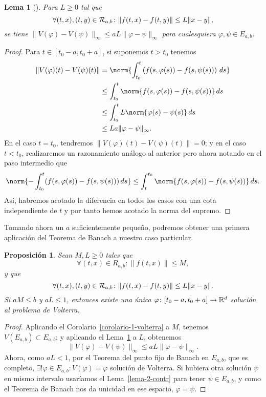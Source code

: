 \documentclass[11pt]{article}
\theoremstyle{plain}
\newtheorem{proposition}{Proposición}
\newtheorem{lemma}{Lema}
\theoremstyle{definition}
\theoremstyle{remark}
\begin{document}
\begin{lemma}[]\label{lema-3-contr}
  Para $L \geq 0$ tal que
  \[
    \forall (t,x),(t,y) \in {{\cal{R}}}_{a,b}\colon
    \| f(t,x) - f(t,y) \| \leq L \|x-y\|, 
  \]
  se tiene $\|V(\varphi) - V(\psi)\|_\infty \leq aL\|\varphi - \psi\|_\infty$ para cualesquiera $\varphi,\psi \in E_{a,b}$.
\end{lemma}
\begin{proof}
  Para $t \in [t_0-a,t_0+a]$, si suponemos $t > t_0$ tenemos
  \[\begin{aligned}
  \| V(\varphi)(t) - V(\psi)(t) \| &=
  \norm{ \int_{t_0}^t \left( f(s,\varphi(s)) - f(s,\psi(s)) \right)\,ds } \\&\leq
  \int_{t_0}^t \norm{  f(s,\varphi(s)) - f(s,\psi(s)) }\,ds \\&\leq
  \int_{t_0}^t L\norm{ \varphi(s)-\psi(s) }\,ds \\&\leq
  La\|\varphi-\psi\|_{\infty}.
  \end{aligned}\]
En el caso $t = t_0$, tendremos $\|V(\varphi)(t) - V(\psi)(t)\| = 0$;
y en el caso $t < t_0$, realizaremos un razonamiento análogo al anterior
pero ahora notando en el paso intermedio que
\[\begin{aligned}
  \norm{-\int_{t_0}^t  (f(s,\varphi(s)) - f(s,\psi(s))) \,ds} \leq
  \int_{t}^{t_0} \norm{f(s,\varphi(s)) - f(s,\psi(s))}\,ds.
\end{aligned}\]
Así, habremos acotado la diferencia en todos los casos con una cota independiente
de $t$ y por tanto hemos acotado la norma del supremo.
\end{proof}

Tomando ahora un $a$ suficientemente pequeño, podremos obtener una primera
aplicación del Teorema de Banach a nuestro caso particular.

\begin{proposition}\label{proposicion-1-contr}
Sean $M,L \geq 0$ tales que
\[\forall (t,x) \in R_{a,b}\colon \|f(t,x)\| \leq M,\]
y que
\[\forall (t,x),(t,y) \in {{\cal{R}}}_{a,b}\colon \|f(t,x)-f(t,y)\| \leq L\|x-y\|.\]
Si $aM\leq b$ y $aL \leq 1$, entonces existe una única $\varphi\colon [t_0-a,t_0+a] \to \mathbb{R}^d$
solución al problema de Volterra.
\end{proposition}
\begin{proof}
Aplicando el Corolario~\ref{corolario-1-volterra} a $M$, tenemos $V(E_{a,b}) \subset E_{a,b}$;
y aplicando el Lema~\ref{lema-3-contr} a $L$, obtenemos
\[
\| V(\varphi) - V(\psi) \|_{\infty} \leq aL\|\varphi-\psi\|_{\infty}.
\]
Ahora, como $aL < 1$, por el Teorema del punto fijo de Banach en $E_{a,b}$, que es completo,
$\exists! \varphi \in E_{a,b} \colon V(\varphi) = \varphi$
solución de Volterra. Si hubiera otra solución $\psi$ en mismo intervalo usaríamos
el Lema~\ref{lema-2-contr} para tener $\psi \in E_{a,b}$, y como el Teorema de Banach nos
da unicidad en ese espacio, $\varphi = \psi$.
\end{proof}
\end{document}
